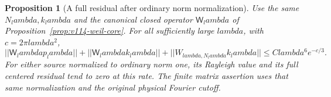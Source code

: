 \documentclass[11pt]{article}
\def\lambda{lambda}%
\def\norm#1{||#1||}%
\newtheorem{proposition}[theorem]{Proposition}
\theoremstyle{remark}
\newcommand{\norm}[1]{\left\lVert #1\right\rVert}
\begin{document}
\begin{proposition}[A full residual after ordinary norm normalization]
\label{prop:v115-absolute-residual}
Use the same $N_\lambda,k_\lambda$ and the canonical closed operator
$\mathsf W_\lambda$ of Proposition~\ref{prop:v114-weil-core}.
For all sufficiently large $\lambda$, with $c=2\pi\lambda^2$,
\begin{equation}\label{eq:v115-absolute-residual}
 \norm{\mathsf W_\lambda p_\lambda}
 +\norm{\mathsf W_\lambda k_\lambda}
 +\norm{W_{\lambda,N_\lambda}k_\lambda}
       \le C\lambda^6 e^{-c/3}.
\end{equation}
For either source normalized to ordinary norm one, its Rayleigh value
and its full centered residual tend to zero at this rate. The finite
matrix assertion uses that same normalization and the original physical
Fourier cutoff.
\end{proposition}
\end{document}
